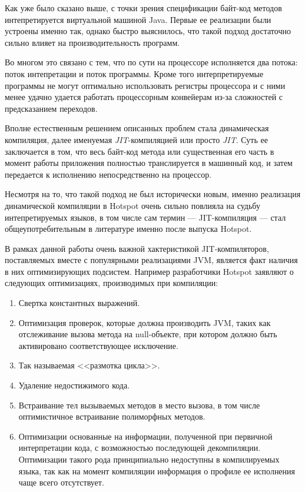 Как уже было сказано выше, с точки зрения спецификации байт-код методов интепретируется виртуальной
машиной Java.
Первые ее реализации были устроены именно так, однако быстро выяснилось,
что такой подход достаточно сильно влияет на производительность программ.

Во многом это связано с тем, что по сути на процессоре исполняется два потока: поток интепретации
и поток программы.
Кроме того интерпретируемые программы не могут оптимально использовать регистры процессора и с ними
менее удачно удается работать процессорным конвейерам из-за сложностей с предсказанием переходов.


Вполне естественным решением описанных проблем стала динамическая компиляция, далее именуемая
\textit{JIT}-компиляцией или просто \textit{JIT}. Суть ее заключается в том, что весь байт-код
метода или существенная его часть в момент работы приложения полностью транслируется в машинный код,
и затем передается к исполнению непосредственно на процессор.

Несмотря на то, что такой подход не был исторически новым, именно реализация динамической
компиляции в Hotspot очень сильно повлияла на судьбу интепретируемых языков, в том числе
сам термин --- JIT-компиляция --- стал общеупотребительным в литературе именно после выпуска Hotspot.%

В рамках данной работы очень важной хактеристикой JIT-компиляторов, поставляемых вместе
с популярными реализациями JVM, является факт наличия в них оптимизирующих подсистем. Например
разработчики Hotspot заявляют о следующих оптимизациях, производимых при компиляции:
\begin{enumerate}
    \item Свертка константных выражений.
    \item Оптимизация проверок, которые должна производить JVM, таких как отслеживание вызова
    метода на null-объекте, при котором должно быть активировано соответствующее исключение.
    \item Так называемая <<размотка цикла>>. %
    \item Удаление недостижимого кода.
    \item Встраивание тел вызываемых методов в место вызова, в том числе оптимистичное встраивание
    полиморфных методов.
    \item Оптимизации основанные на информации, полученной при первичной интерпретации кода,
    с возможностью последующей декомпиляции. Оптимизации такого рода принципиально недоступны
    в компилируемых языка, так как на момент компиляции информация о профиле ее исполнения чаще
    всего отсутствует.
\end{enumerate}

